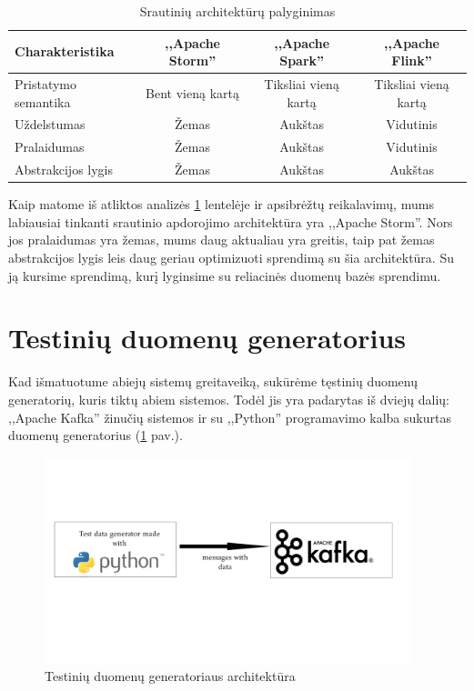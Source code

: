 \documentclass{VUMIFPSkursinis}
\begin{document}
\begin{center}
    \begin{table}[!htbp]
        \caption{Srautinių architektūrų palyginimas}
        \label{table:comparer}
        \begin{tabular}{ | l | c | c | c | } 
            \hline
            Charakteristika & ,,Apache Storm'' & ,,Apache Spark'' & ,,Apache Flink'' \\* \hline
            Pristatymo semantika & Bent vieną kartą & Tiksliai vieną kartą & Tiksliai vieną kartą \\* \hline
            Uždelstumas & Žemas & Aukštas & Vidutinis \\* \hline
            Pralaidumas & Žemas & Aukštas & Vidutinis \\* \hline
            Abstrakcijos lygis & Žemas & Aukštas & Aukštas \\* \hline
        \end{tabular}
    \end{table}
\end{center}\par

Kaip matome iš atliktos analizės \ref{table:comparer} lentelėje ir apsibrėžtų reikalavimų, mums labiausiai tinkanti srautinio apdorojimo architektūra yra ,,Apache Storm''. 
Nors jos pralaidumas yra žemas, mums daug aktualiau yra greitis, taip pat žemas abstrakcijos lygis leis daug geriau optimizuoti sprendimą su šia architektūra. Su ją kursime
sprendimą, kurį lyginsime su reliacinės duomenų bazės sprendimu.

\section{Testinių duomenų generatorius}

Kad išmatuotume abiejų sistemų greitaveiką, sukūrėme tęstinių duomenų generatorių, kuris tiktų abiem sistemos. Todėl jis yra padarytas iš dviejų dalių:
,,Apache Kafka'' žinučių sistemos ir su ,,Python'' programavimo kalba sukurtas duomenų generatorius (\ref{fig:generator} pav.).

\begin{figure}[!htbp]
    \centering
    \includegraphics[width=0.95\textwidth]{img/testdatagenerator.jpg}
    \caption{Testinių duomenų generatoriaus architektūra}
    \label{fig:generator}
\end{figure}
\end{document}

